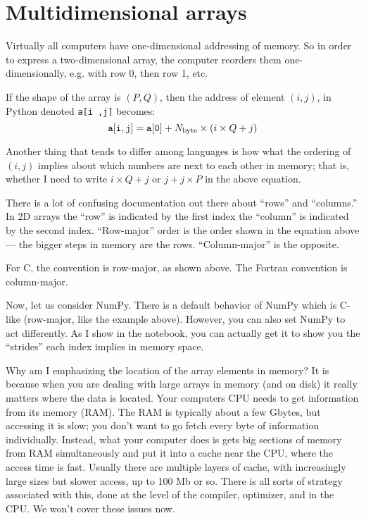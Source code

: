 \section{Multidimensional arrays}

Virtually all computers have one-dimensional addressing of memory. So
in order to express a two-dimensional array, the computer reorders
them one-dimensionally, e.g. with row 0, then row 1, etc.


\begin{answer}
If the
shape of the array is $(P, Q)$, then the address of element $(i,j)$,
in Python denoted {\tt{a[i ,j]}} becomes:
\begin{equation}
  {\tt a[i, j]} = {\tt a[0]} + N_{\rm byte} \times (i \times Q + j)
\end{equation}

Another thing that tends to differ among languages is how what the
ordering of $(i, j)$ implies about which numbers are next to each
other in memory; that is, whether I need to write $i\times Q +j$ or $j
+ j\times P$ in the above equation.

There is a lot of confusing documentation out there about ``rows'' and
``columns.'' In 2D arrays the ``row'' is indicated by the first index
the ``column'' is indicated by the second index. ``Row-major'' order
is the order shown in the equation above --- the bigger steps in
memory are the rows.  ``Column-major'' is the opposite.

For C, the convention is row-major, as shown above. The Fortran
convention is column-major.

Now, let us consider NumPy. There is a default behavior of NumPy which
is C-like (row-major, like the example above). However, you can also
set NumPy to act differently. As I show in the notebook, you can
actually get it to show you the ``strides'' each index implies in
memory space.
\end{answer}

Why am I emphasizing the location of the array elements in memory? It
is because when you are dealing with large arrays in memory (and on
disk) it really matters where the data is located. Your computers CPU
needs to get information from its memory (RAM). The RAM is typically
about a few Gbytes, but accessing it is slow; you don't want to go
fetch every byte of information individually. Instead, what your
computer does is gets big sections of memory from RAM simultaneously
and put it into a cache near the CPU, where the access time is
fast. Usually there are multiple layers of cache, with increasingly
large sizes but slower access, up to 100 Mb or so. There is all sorts
of strategy associated with this, done at the level of the compiler,
optimizer, and in the CPU. We won't cover these issues now.

